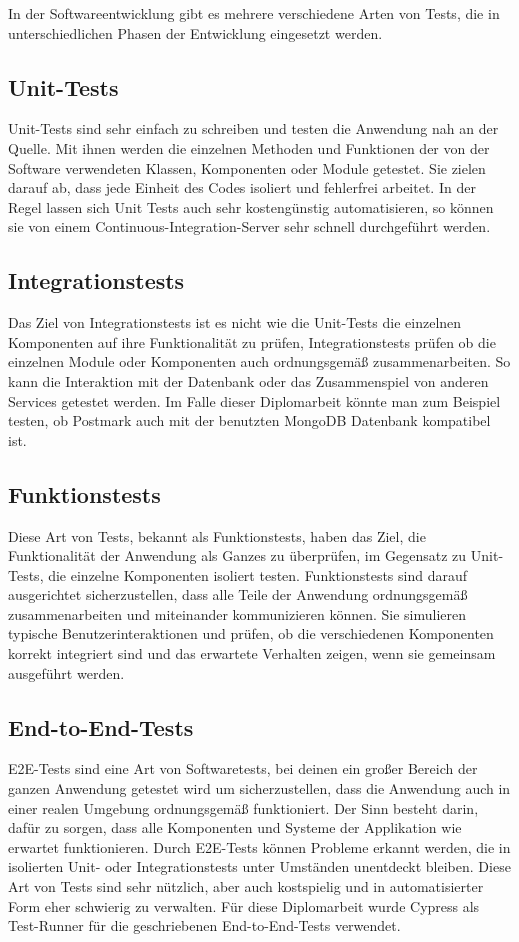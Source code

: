 In der Softwareentwicklung gibt es mehrere verschiedene Arten von Tests, die in unterschiedlichen Phasen der Entwicklung eingesetzt werden.

\subsection{Unit-Tests}
Unit-Tests sind sehr einfach zu schreiben und testen die Anwendung nah an der Quelle. Mit ihnen werden die einzelnen Methoden und Funktionen der von der Software verwendeten Klassen, Komponenten oder Module getestet. Sie zielen darauf ab, dass jede Einheit des Codes isoliert und fehlerfrei arbeitet. In der Regel lassen sich Unit Tests auch sehr kostengünstig automatisieren, so können sie von einem Continuous-Integration-Server sehr schnell durchgeführt werden.


\subsection{Integrationstests}
Das Ziel von Integrationstests ist es nicht wie die Unit-Tests die einzelnen Komponenten auf ihre Funktionalität zu prüfen, Integrationstests prüfen ob die einzelnen Module oder Komponenten auch ordnungsgemäß zusammenarbeiten. So kann die Interaktion mit der Datenbank oder das Zusammenspiel von anderen Services getestet werden. Im Falle dieser Diplomarbeit könnte man zum Beispiel testen, ob Postmark auch mit der benutzten MongoDB Datenbank kompatibel ist.

\subsection{Funktionstests}
Diese Art von Tests, bekannt als Funktionstests, haben das Ziel, die Funktionalität der Anwendung als Ganzes zu überprüfen, im Gegensatz zu Unit-Tests, die einzelne Komponenten isoliert testen. Funktionstests sind darauf ausgerichtet sicherzustellen, dass alle Teile der Anwendung ordnungsgemäß zusammenarbeiten und miteinander kommunizieren können. Sie simulieren typische Benutzerinteraktionen und prüfen, ob die verschiedenen Komponenten korrekt integriert sind und das erwartete Verhalten zeigen, wenn sie gemeinsam ausgeführt werden.

\subsection{End-to-End-Tests}
E2E-Tests sind eine Art von Softwaretests, bei deinen ein großer Bereich der ganzen Anwendung getestet wird um sicherzustellen, dass die Anwendung auch in einer realen Umgebung ordnungsgemäß funktioniert. Der Sinn besteht darin, dafür zu sorgen, dass alle Komponenten und Systeme der Applikation wie erwartet funktionieren. Durch E2E-Tests können Probleme erkannt werden, die in isolierten Unit- oder Integrationstests unter Umständen unentdeckt bleiben. Diese Art von Tests sind sehr nützlich, aber auch kostspielig und in automatisierter Form eher schwierig zu verwalten. Für diese Diplomarbeit wurde Cypress als Test-Runner für die geschriebenen End-to-End-Tests verwendet.
\cite{Verschiedene_Testarten}
